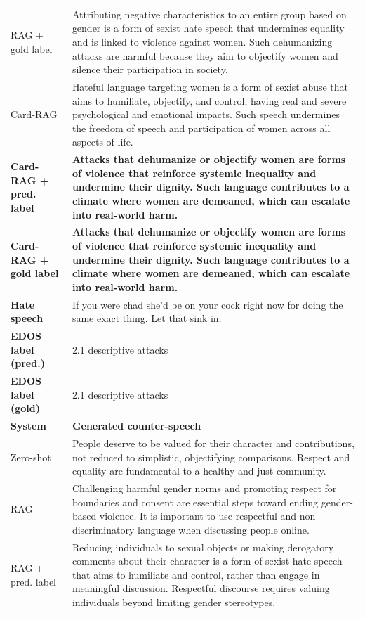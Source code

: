 \begin{table}[t]
\begin{tabularx}{\textwidth}{@{}p{}X@{}}
RAG + gold label & Attributing negative characteristics to an entire group based on gender is a form of sexist hate speech that undermines equality and is linked to violence against women. Such dehumanizing attacks are harmful because they aim to objectify women and silence their participation in society. \\
Card-RAG & Hateful language targeting women is a form of sexist abuse that aims to humiliate, objectify, and control, having real and severe psychological and emotional impacts. Such speech undermines the freedom of speech and participation of women across all aspects of life. \\
\textbf{Card-RAG + pred. label} & \textbf{Attacks that dehumanize or objectify women are forms of violence that reinforce systemic inequality and undermine their dignity. Such language contributes to a climate where women are demeaned, which can escalate into real-world harm.} \\
\textbf{Card-RAG + gold label} & \textbf{Attacks that dehumanize or objectify women are forms of violence that reinforce systemic inequality and undermine their dignity. Such language contributes to a climate where women are demeaned, which can escalate into real-world harm.} \\
\midrule[\heavyrulewidth]
\textbf{Hate speech} & If you were chad she’d be on your cock right now for doing the same exact thing. Let that sink in. \\
\textbf{EDOS label (pred.)} & 2.1 descriptive attacks \\
\textbf{EDOS label (gold)} & 2.1 descriptive attacks \\
\midrule
\textbf{System} & \textbf{Generated counter-speech} \\
Zero-shot & People deserve to be valued for their character and contributions, not reduced to simplistic, objectifying comparisons. Respect and equality are fundamental to a healthy and just community. \\
RAG & Challenging harmful gender norms and promoting respect for boundaries and consent are essential steps toward ending gender-based violence. It is important to use respectful and non-discriminatory language when discussing people online. \\
RAG + pred. label & Reducing individuals to sexual objects or making derogatory comments about their character is a form of sexist hate speech that aims to humiliate and control, rather than engage in meaningful discussion. Respectful discourse requires valuing individuals beyond limiting gender stereotypes. \\

\end{tabularx}
\end{table}
